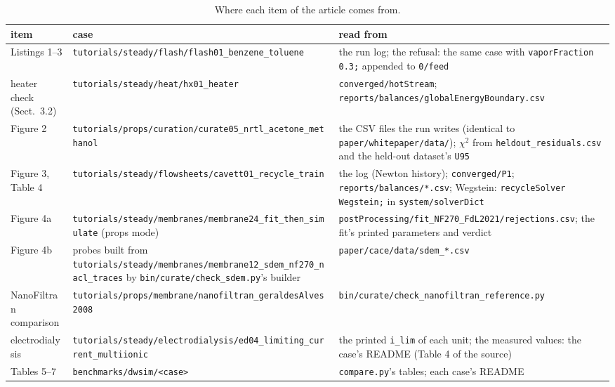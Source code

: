 \documentclass[11pt]{article}
\newcommand{\code}[1]{\nolinkurl{#1}}
\begin{document}
\begin{table}[h]
\centering\footnotesize
\caption{Where each item of the article comes from.}
\label{tab:repro}
\begin{tabularx}{\linewidth}{>{\raggedright\arraybackslash}p{3.2cm}
                             >{\raggedright\arraybackslash}p{5.6cm}
                             >{\raggedright\arraybackslash}X}
\toprule
\textbf{item} & \textbf{case} & \textbf{read from} \\
\midrule
Listings 1--3 & \code{tutorials/steady/flash/flash01_benzene_toluene} &
  the run log; the refusal: the same case with \code{vaporFraction 0.3;}
  appended to \code{0/feed} \\
heater check (Sect.~3.2) & \code{tutorials/steady/heat/hx01_heater} &
  \code{converged/hotStream}; \code{reports/balances/globalEnergyBoundary.csv} \\
Figure 2 & \code{tutorials/props/curation/curate05_nrtl_acetone_methanol} &
  the CSV files the run writes (identical to
  \code{paper/whitepaper/data/}); $\chi^2$ from
  \code{heldout_residuals.csv} and the held-out dataset's \code{U95} \\
Figure 3, Table 4 & \code{tutorials/steady/flowsheets/cavett01_recycle_train}
  & the log (Newton history); \code{converged/P1};
  \code{reports/balances/*.csv}; Wegstein: \code{recycleSolver Wegstein;}
  in \code{system/solverDict} \\
Figure 4a & \code{tutorials/steady/membranes/membrane24_fit_then_simulate}
  (props mode) & \code{postProcessing/fit_NF270_FdL2021/rejections.csv};
  the fit's printed parameters and verdict \\
Figure 4b & probes built from
  \code{tutorials/steady/membranes/membrane12_sdem_nf270_nacl_traces} by
  \code{bin/curate/check_sdem.py}'s builder & \code{paper/cace/data/sdem_*.csv} \\
NanoFiltran comparison & \code{tutorials/props/membrane/nanofiltran_geraldesAlves2008}
  & \code{bin/curate/check_nanofiltran_reference.py} \\
electrodialysis & \code{tutorials/steady/electrodialysis/ed04_limiting_current_multiionic}
  & the printed \code{i_lim} of each unit; the measured values: the case's
  README (Table 4 of the source) \\
Tables 5--7 & \code{benchmarks/dwsim/<case>} & \code{compare.py}'s tables;
  each case's README \\
\bottomrule
\end{tabularx}
\end{table}
\end{document}
